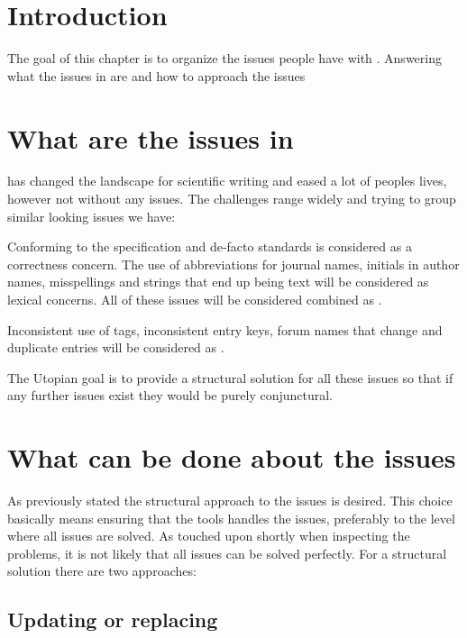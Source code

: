 \section{Introduction}
The goal of this chapter is to organize the issues people have with
{\bibtex}.  Answering what the issues in {\bibtex} are
 and how to approach the {\bibtex}
issues 

\section{What are the issues in {\bibtex}}
\label{sec:intro_what_issues}

{\bibtex} has changed the landscape for scientific writing and eased a
lot of peoples lives, however not without any issues.  The challenges
range widely and trying to group similar looking issues we have:


Conforming to the specification and de-facto standards is considered
as a correctness concern.  The use of abbreviations for journal names,
initials in author names, misspellings and {\bibtex} strings that end
up being text will be considered as lexical concerns.
All of these issues will be considered combined as .

Inconsistent use of tags, inconsistent entry keys, forum names that
change and duplicate entries will be considered as .

The Utopian goal is to provide a structural solution for all these
issues so that if any further issues exist they would be purely
conjunctural.


\section{What can be done about the {\bibtex} issues}
\label{sec:intro_what_to_do}

As previously stated the structural approach to the issues is desired.
This choice basically means ensuring that the tools handles the
issues, preferably to the level where all issues are solved.  As
touched upon shortly when inspecting the problems, it is not likely
that all issues can be solved perfectly.  For a structural solution
there are two approaches:


\subsection{Updating or replacing {\bibtex}}

